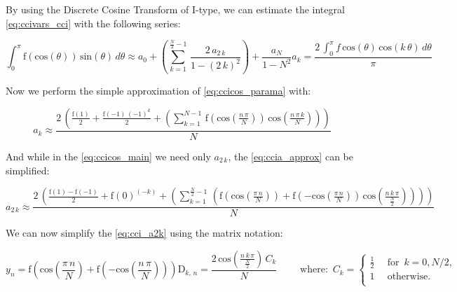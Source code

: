 \documentclass[12pt,twoside,a4paper]{article}
\numberwithin{equation}{subsection}
\numberwithin{figure}{subsection}
\begin{document}
By using the Discrete Cosine Transform of I-type, we can estimate the integral \ref{eq:ccivars_cci} with the following series:

\begin{subequations} \label{eq:cci_costrans}
  \begin{equation}   \label{eq:ccicos_main}
    \int_{0}^{\pi }\mathrm{f}(\mathrm{cos}(\theta ))\,\mathrm{sin}(\theta )\,d\theta \approx {a_{0}} +  \left( \! \sum_{k=1}^{\frac
    {N}{2} - 1}\,\frac {2\, {a_{2\,k}}}{1 - (2\,k)^{2}} \!  \right) + \frac {{a_{N}}}{1 - N ^{2}}  
  \end{equation}
  \begin{equation}   \label{eq:ccicos_parama}
    {a_{k}}=\frac {2\,\int_{0}^{\pi }f\,\mathrm{cos}(\theta )\, \mathrm{cos}(k\,\theta )\,d\theta }{\pi }  
  \end{equation}
\end{subequations}

Now we perform the simple approximation of \ref{eq:ccicos_parama} with:

\begin{equation} \label{eq:ccia_approx}
  {a_{k}} \approx \frac {2\, \left(  \! \frac {\mathrm{f}(1)}{2} + \frac {\mathrm{f}( - 1)\,( - 1)^{k}}{2} +  \left( \!
  \sum_{k=1}^{N - 1}\, \mathrm{f}(\mathrm{cos}(\frac {n\,\pi }{N}))\,\mathrm{cos}(\frac {n\,\pi \,k}{N}) \!  \right)  \!
  \right)}{N}
\end{equation}
 
And while in the \ref{eq:ccicos_main} we need only ${a_{2\,k}}$, the \ref{eq:ccia_approx} can be simplified:

\begin{equation} \label{eq:cci_a2k}
  {a_{2\,k}} \approx \frac {2\, \left(  \! \frac {\mathrm{f}(1) - \mathrm{f}( - 1)}{2} + \mathrm{f}(0)^{( - k)} +  \left(  \!
  \sum_{k=1}^{\frac {N}{2} - 1}\, \left(  \! \mathrm{f}(\mathrm{cos}(\frac {\pi \,n}{N}))+ \mathrm{f}( - \mathrm{cos}(\frac {\pi
  \,n}{N}))\,\mathrm{cos} \left(  \! \frac {n\,k\,\pi }{\frac {N}{2}} \!  \right)  \!  \right)  \!  \right)  \!  \right) }{N}  
\end{equation}

We can now simplify the \ref{eq:cci_a2k} using the matrix notation:

\begin{subequations} \label{eq:cci_matrix}
  \begin{equation}   \label{eq:ccimatrix_yn}
    {y_{n}}=\mathrm{f}(\mathrm{cos}(\frac {\pi \,n}{N}) + \mathrm{f}( - \mathrm{cos}(\frac {n\,\pi }{N})))  
  \end{equation}
  \begin{equation}   \label{eq:ccimatrix_dkn}
    {\mathrm{D}_{k, \,n}}=\frac {2\,\mathrm{cos} \left(  \! \frac {n\,k\,\pi }{\frac {N}{2}} \!  \right) \,{C_{k}}}{N}
    \qquad \mbox{ where: }\, {C_{k}} = 
    \begin{cases} 
      \frac {1}{2}\, & \mbox{ for }\,k = 0, N/2, \\ 
      1 & \mbox{ otherwise. } \\
    \end{cases}
  \end{equation}
\end{subequations}
\end{document}
